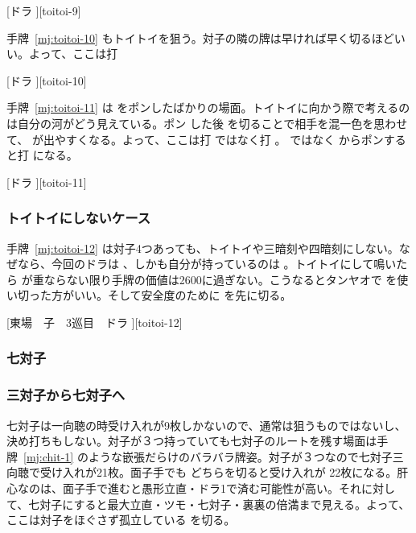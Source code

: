 \documentclass[../nankiru_main.tex]{subfiles}
\begin{document}
[ドラ ][toitoi-9]

手牌~\ref{mj:toitoi-10} もトイトイを狙う。対子の隣の牌は早ければ早く切るほどいい。よって、ここは打 

[ドラ ][toitoi-10]

手牌~\ref{mj:toitoi-11} は  をポンしたばかりの場面。トイトイに向かう際で考えるのは自分の河がどう見えている。ポン  した後  を切ることで相手を混一色を思わせて、 が出やすくなる。よって、ここは打  ではなく打 。 ではなく  からポンすると打  になる。

[ドラ ][toitoi-11]


\subsubsection*{トイトイにしないケース}

手牌~\ref{mj:toitoi-12} は対子4つあっても、トイトイや三暗刻や四暗刻にしない。なぜなら、今回のドラは 、しかも自分が持っているのは 。トイトイにして鳴いたら  が重ならない限り手牌の価値は2600に過ぎない。こうなるとタンヤオで  を使い切った方がいい。そして安全度のために  を先に切る\citep[][pp.~128--129]{fkt}。

[東場　子　3巡目　ドラ ][toitoi-12]


\subsubsection{七対子}

\subsubsection*{三対子から七対子へ}

七対子は一向聴の時受け入れが9枚しかないので、通常は狙うものではないし、決め打ちもしない。対子が３つ持っていても七対子のルートを残す場面は手牌~\ref{mj:chit-1} のような嵌張だらけのバラバラ牌姿。対子が３つなので七対子三向聴で受け入れが21枚。面子手でも  どちらを切ると受け入れが  22枚になる。肝心なのは、面子手で進むと愚形立直・ドラ1で済む可能性が高い。それに対して、七対子にすると最大立直・ツモ・七対子・裏裏の倍満まで見える。よって、ここは対子をほぐさず孤立している  を切る\citep[][pp.~82--83]{zero-teyaku}。
\end{document}
